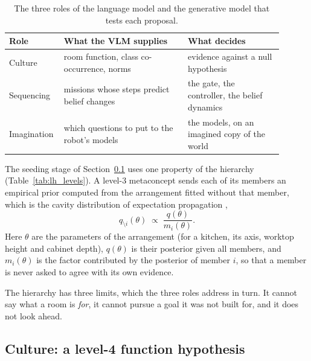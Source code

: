 \begin{table}[ht]
    \centering
    \small
    \begin{tabular}{|>{\raggedright\arraybackslash}p{0.14\linewidth}|>{\raggedright\arraybackslash}p{0.43\linewidth}|>{\raggedright\arraybackslash}p{0.33\linewidth}|}
        \hline
        \textbf{Role} & \textbf{What the VLM supplies} & \textbf{What decides} \\ \hline
        Culture     & room function, class co-occurrence, norms & evidence against a null hypothesis \\ \hline
        Sequencing  & missions whose steps predict belief changes & the gate, the controller, the belief dynamics \\ \hline
        Imagination & which questions to put to the robot's models & the models, on an imagined copy of the world \\ \hline
    \end{tabular}
    \caption{The three roles of the language model and the generative model that tests each proposal.}
    \label{tab:lh_roles}
\end{table}

The seeding stage of Section~\ref{sec:lang_hierarchy:culture} uses one property of the hierarchy
(Table~\ref{tab:lh_levels}). A level-3 metaconcept sends each of its members an empirical
prior computed from the arrangement fitted without that member, which is the cavity distribution of expectation
propagation \cite{minka2001expectation},
\begin{equation}
    q_{\setminus i}(\theta) \;\propto\; \frac{q(\theta)}{m_i(\theta)}.
    \label{eq:lh_cavity}
\end{equation}
Here $\theta$ are the parameters of the arrangement (for a kitchen, its axis, worktop height and cabinet depth),
$q(\theta)$ is their posterior given all members, and $m_i(\theta)$ is the factor contributed by the posterior of
member $i$, so that a member is never asked to agree with its own evidence.

The hierarchy has three limits, which the three roles address in turn. It cannot say what a room is \emph{for}, it
cannot pursue a goal it was not built for, and it does not look ahead.

\subsection{Culture: a level-4 function hypothesis}
\label{sec:lang_hierarchy:culture}

